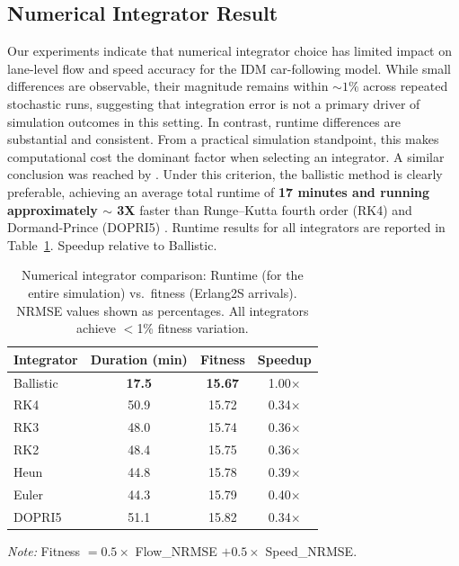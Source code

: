 \documentclass{scspaperproc}
\theoremstyle{scsthe}
\begin{document}
\subsection{Numerical Integrator Result}
Our experiments indicate that numerical integrator choice has limited impact on lane-level flow and speed accuracy for the IDM car-following model. While small differences are observable, their magnitude remains within $\sim 1\%$ across repeated stochastic runs, suggesting that integration error is not a primary driver of simulation outcomes in this setting. In contrast, runtime differences are substantial and consistent. From a practical simulation standpoint, this makes computational cost the dominant factor when selecting an integrator. A similar conclusion was reached by \cite{treiber2015comparing, pvrikryl2017comparing}. Under this criterion, the ballistic method is clearly preferable, achieving an average total runtime of \textbf{17 minutes and running approximately $\sim$ 3X} faster than Runge–Kutta fourth order (RK4) and Dormand-Prince (DOPRI5) \cite{dormand1980family}. Runtime results for all integrators are reported in Table~\ref{tab:integrator-comparison}. Speedup relative to Ballistic. 
\begin{table}[H]
    \centering
    \begin{tabular}{lccc}
        \hline
        \textbf{Integrator} & \textbf{Duration (min)} & \textbf{Fitness} & \textbf{Speedup} \\
        \hline
        Ballistic & \textbf{17.5} & \textbf{15.67} & 1.00$\times$ \\
        RK4       & 50.9 & 15.72 & 0.34$\times$ \\
        RK3       & 48.0 & 15.74 & 0.36$\times$ \\
        RK2       & 48.4 & 15.75 & 0.36$\times$ \\
        Heun      & 44.8 & 15.78 & 0.39$\times$ \\
        Euler     & 44.3 & 15.79 & 0.40$\times$ \\
        DOPRI5    & 51.1 & 15.82 & 0.34$\times$ \\
        \hline
    \end{tabular}
    \begin{flushleft}
        \footnotesize
        \textit{Note:} Fitness $= 0.5 \times$ Flow\_NRMSE $+ 0.5 \times$ Speed\_NRMSE.
    \end{flushleft}
    \caption{Numerical integrator comparison: Runtime (for the entire simulation) vs.\ fitness (Erlang2S arrivals). NRMSE values shown as percentages. All integrators achieve $<$1\% fitness variation. }
     \label{tab:integrator-comparison}
\end{table}
\end{document}
